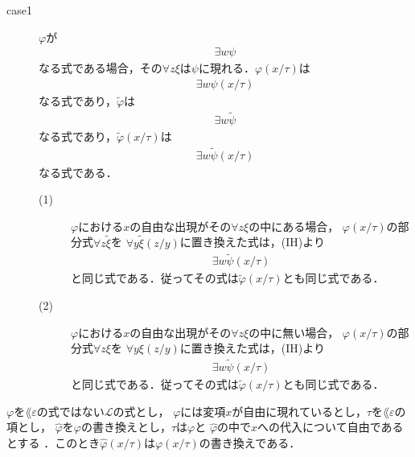 \begin{metaprf}
\begin{description}
\begin{description}
					\item[case1] $\varphi$が
						\begin{align}
							\exists w \psi
						\end{align}
						なる式である場合，その$\forall z \xi$は$\psi$に現れる．$\varphi(x/\tau)$は
						\begin{align}
							\exists w \psi(x/\tau)
						\end{align}
						なる式であり，$\widetilde{\varphi}$は
						\begin{align}
							\exists w \widetilde{\psi}
						\end{align}
						なる式であり，$\widetilde{\varphi}(x/\tau)$は
						\begin{align}
							\exists w \widetilde{\psi}(x/\tau)
						\end{align}
						なる式である．
						\begin{description}
							\item[(1)] $\varphi$における$x$の自由な出現がその$\forall z \xi$の中にある場合，
								$\varphi(x/\tau)$の部分式$\forall z \widetilde{\xi}$を
								$\forall y \widetilde{\xi}(z/y)$に置き換えた式は，(IH)より
								\begin{align}
									\exists w \widetilde{\psi}(x/\tau)
								\end{align}
								と同じ式である．従ってその式は$\widetilde{\varphi}(x/\tau)$とも同じ式である．
								
							\item[(2)] $\varphi$における$x$の自由な出現がその$\forall z \xi$の中に無い場合，
								$\varphi(x/\tau)$の部分式$\forall z \xi$を
								$\forall y \xi(z/y)$に置き換えた式は，(IH)より
								\begin{align}
									\exists w \widetilde{\psi}(x/\tau)
								\end{align}
								と同じ式である．従ってその式は$\widetilde{\varphi}(x/\tau)$とも同じ式である．
								\QED
						\end{description}
				\end{description}
		\end{description}
	\end{metaprf}
	
	
	\begin{screen}
		\begin{metathm}[書き換えへの代入は代入した式の書き換え]
		\label{metathm:substitution_to_rewritten_formula}
			$\varphi$を$\lang{\varepsilon}$の式ではない$\mathcal{L}$の式とし，
			$\varphi$には変項$x$が自由に現れているとし，$\tau$を$\lang{\varepsilon}$の項とし，
			$\widehat{\varphi}$を$\varphi$の書き換えとし，$\tau$は$\varphi$と
			$\widehat{\varphi}$の中で$x$への代入について自由であるとする\footnotemark
			．このとき$\widehat{\varphi}(x/\tau)$は$\varphi(x/\tau)$の書き換えである．
		\end{metathm}
	\end{screen}
	
